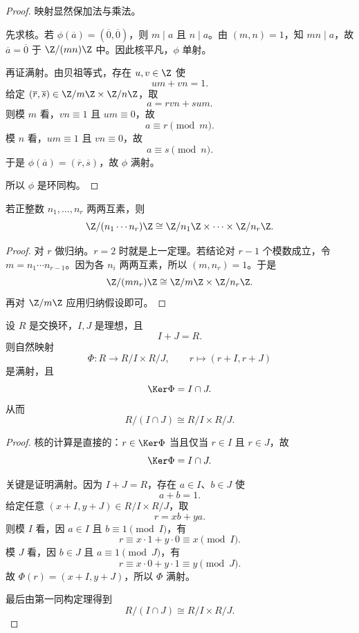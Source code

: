 \begin{proof}
映射显然保加法与乘法。

先求核。若 $\phi(\overline{a})=(\overline{0},\overline{0})$，则 $m\mid a$ 且 $n\mid a$。由 $(m,n)=1$，知 $mn\mid a$，故 $\overline{a}=\overline{0}$ 于 $\Z/(mn)\Z$ 中。因此核平凡，$\phi$ 单射。

再证满射。由贝祖等式，存在 $u,v\in\Z$ 使
\[
um+vn=1.
\]
给定 $(\overline{r},\overline{s})\in \Z/m\Z\times \Z/n\Z$，取
\[
a=rvn+sum.
\]
则模 $m$ 看，$vn\equiv 1$ 且 $um\equiv 0$，故
\[
a\equiv r\pmod m.
\]
模 $n$ 看，$um\equiv 1$ 且 $vn\equiv 0$，故
\[
a\equiv s\pmod n.
\]
于是 $\phi(\overline{a})=(\overline{r},\overline{s})$，故 $\phi$ 满射。

所以 $\phi$ 是环同构。
\end{proof}

\begin{corollary}
若正整数 $n_1,\dots,n_r$ 两两互素，则
\[
\Z/(n_1\cdots n_r)\Z\cong \Z/n_1\Z\times\cdots\times \Z/n_r\Z.
\]
\end{corollary}

\begin{proof}
对 $r$ 做归纳。$r=2$ 时就是上一定理。若结论对 $r-1$ 个模数成立，令 $m=n_1\cdots n_{r-1}$。因为各 $n_i$ 两两互素，所以 $(m,n_r)=1$。于是
\[
\Z/(mn_r)\Z\cong \Z/m\Z\times \Z/n_r\Z.
\]
再对 $\Z/m\Z$ 应用归纳假设即可。
\end{proof}

\begin{theorem}
设 $R$ 是交换环，$I,J$ 是理想，且
\[
I+J=R.
\]
则自然映射
\[
\Phi:R\longrightarrow R/I\times R/J,
\qquad r\longmapsto (r+I,r+J)
\]
是满射，且
\[
\Ker\Phi=I\cap J.
\]
从而
\[
R/(I\cap J)\cong R/I\times R/J.
\]
\end{theorem}

\begin{proof}
核的计算是直接的：$r\in\Ker\Phi$ 当且仅当 $r\in I$ 且 $r\in J$，故
\[
\Ker\Phi=I\cap J.
\]

关键是证明满射。因为 $I+J=R$，存在 $a\in I$、$b\in J$ 使
\[
a+b=1.
\]
给定任意 $(x+I,y+J)\in R/I\times R/J$，取
\[
r=xb+ya.
\]
则模 $I$ 看，因 $a\in I$ 且 $b\equiv 1\pmod I$，有
\[
r\equiv x\cdot 1+y\cdot 0\equiv x \pmod I.
\]
模 $J$ 看，因 $b\in J$ 且 $a\equiv 1\pmod J$，有
\[
r\equiv x\cdot 0+y\cdot 1\equiv y \pmod J.
\]
故 $\Phi(r)=(x+I,y+J)$，所以 $\Phi$ 满射。

最后由第一同构定理得到
\[
R/(I\cap J)\cong R/I\times R/J.
\]
\end{proof}

